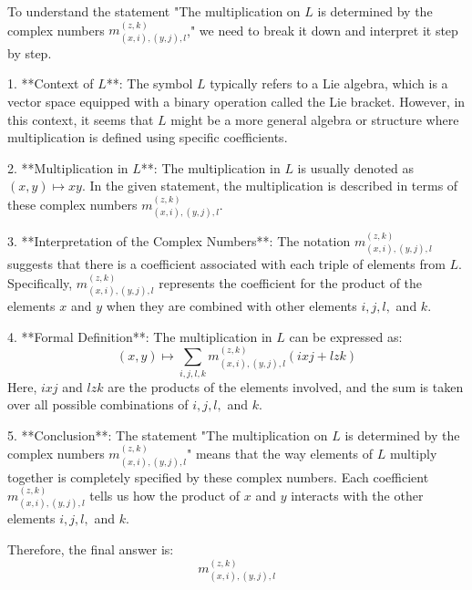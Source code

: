 To understand the statement "The multiplication on \( L \) is determined by the complex numbers \( m_{(x,i),(y,j),l}^{(z,k)} \)," we need to break it down and interpret it step by step.

1. **Context of \( L \)**: The symbol \( L \) typically refers to a Lie algebra, which is a vector space equipped with a binary operation called the Lie bracket. However, in this context, it seems that \( L \) might be a more general algebra or structure where multiplication is defined using specific coefficients.

2. **Multiplication in \( L \)**: The multiplication in \( L \) is usually denoted as \( (x,y) \mapsto xy \). In the given statement, the multiplication is described in terms of these complex numbers \( m_{(x,i),(y,j),l}^{(z,k)} \).

3. **Interpretation of the Complex Numbers**: The notation \( m_{(x,i),(y,j),l}^{(z,k)} \) suggests that there is a coefficient associated with each triple of elements from \( L \). Specifically, \( m_{(x,i),(y,j),l}^{(z,k)} \) represents the coefficient for the product of the elements \( x \) and \( y \) when they are combined with other elements \( i, j, l, \) and \( k \).

4. **Formal Definition**: The multiplication in \( L \) can be expressed as:
   \[
   (x,y) \mapsto \sum_{i,j,l,k} m_{(x,i),(y,j),l}^{(z,k)} (ixj + lzk)
   \]
   Here, \( ixj \) and \( lzk \) are the products of the elements involved, and the sum is taken over all possible combinations of \( i, j, l, \) and \( k \).

5. **Conclusion**: The statement "The multiplication on \( L \) is determined by the complex numbers \( m_{(x,i),(y,j),l}^{(z,k)} \)" means that the way elements of \( L \) multiply together is completely specified by these complex numbers. Each coefficient \( m_{(x,i),(y,j),l}^{(z,k)} \) tells us how the product of \( x \) and \( y \) interacts with the other elements \( i, j, l, \) and \( k \).

Therefore, the final answer is:
\[
\boxed{m_{(x,i),(y,j),l}^{(z,k)}}
\]